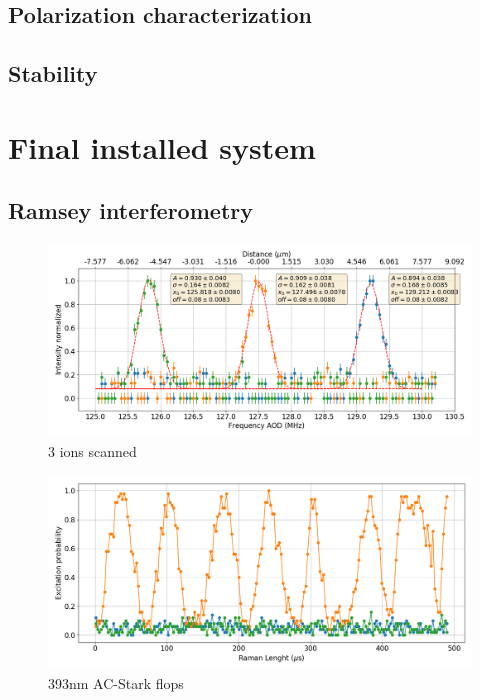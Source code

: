 \documentclass[english, a4paper, 12pt, twoside]{book}
\numberwithin{equation}{section} %
\begin{document}
\subsection{Polarization characterization}
\subsection{Stability}
\section{Final installed system}
\subsection{Ramsey interferometry}
\begin{figure}[H]
\centering
\includegraphics[width=\textwidth]{img/AODscan}
\caption{3 ions scanned}
\end{figure}
\begin{figure}[H]
\centering
\includegraphics[width=\textwidth]{img/ac_stark}
\caption{393nm AC-Stark flops}
\end{figure}
\end{document}
